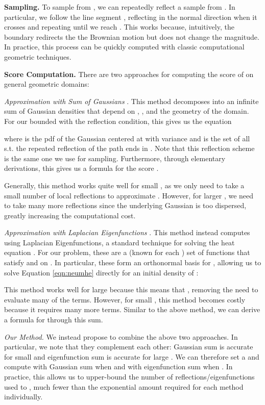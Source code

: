 \documentclass{article}
\theoremstyle{plain}
\theoremstyle{definition}
\theoremstyle{remark}
\begin{document}
\textbf{Sampling.} To sample from , we can repeatedly reflect a sample  from . In particular, we follow the line segment , reflecting in the normal direction when it crosses  and repeating until we reach . This works because, intuitively, the boundary redirects the the Brownian motion but does not change the magnitude. In practice, this process can be quickly computed with classic computational geometric techniques.

\textbf{Score Computation.} There are two approaches for computing the score of  on general geometric domains:

\textit{Approximation with Sum of Gaussians} \citep{Jing2022TorsionalDF}. This method decomposes  into an infinite sum of Gaussian densities that depend on , , and the geometry of the domain. For our bounded  with the reflection condition, this gives us the equation

where  is the pdf of the Gaussian centered at  with variance  and  is the set of all  s.t. the repeated reflection of the path  ends in . Note that this reflection scheme is the same one we use for sampling. Furthermore, through elementary derivations, this gives us a formula for the score .

Generally, this method works quite well for small , as we only need to take a small number of local reflections to approximate . However, for larger , we need to take many more reflections since the underlying Gaussian is too dispersed, greatly increasing the computational cost.

\textit{Approximation with Laplacian Eigenfunctions} \citep{Bortoli2022RiemannianSG}. This method instead computes using Laplacian Eigenfunctions, a standard technique for solving the heat equation \citep{evans10}. For our problem, these are a (known for each ) set of functions  that satisfy  and  on . In particular, these form an orthonormal basis for , allowing us to solve Equation \ref{eqn:neumhe} directly for an initial density of :

This method works well for large  because this means that , removing the need to evaluate many of the terms. However, for small , this method becomes costly because it requires many more terms. Similar to the above method, we can derive a formula for  through this sum.

\textit{Our Method.} We instead propose to combine the above two approaches. In particular, we note that they complement each other: Gaussian sum is accurate for small  and eigenfunction sum is accurate for large . We can therefore set a  and compute with Gaussian sum when  and with eigenfunction sum when . In practice, this allows us to upper-bound the number of reflections/eigenfunctions used to , much fewer than the exponential amount required for each method individually. 
\end{document}
